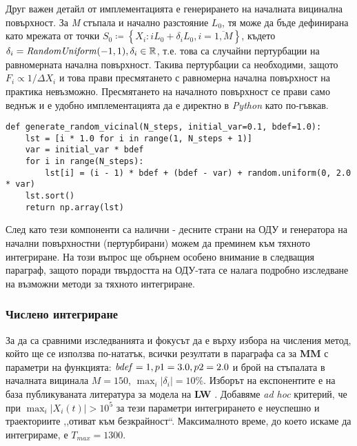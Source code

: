 Друг важен детайл от имплементацията е генерирането на началната вицинална повърхност. За \textit{M} стъпала и начално разстояние $L_0$, тя може да бъде дефинирана като мрежата от точки $S_0 \coloneqq \left\{ X_i: i L_0 + \delta_{i} L_0, i = \overline{1, M} \right\}$, където $\delta_i = \text{\textit{RandomUniform}}(-1,1), \delta_{i} \in \mathbb{R}$, т.е. това са случайни пертурбации на равномерната начална повърхност. Такива пертурбации са необходими, защото $F_i \propto 1/\Delta X_i$ и това прави пресмятането с равномерна начална повърхност на практика невъзможно. Пресмятането на началното повърхност се прави само веднъж и е удобно имплементацията да е директно в \textit{Python} като по-гъвкав.
\begin{verbatim}
def generate_random_vicinal(N_steps, initial_var=0.1, bdef=1.0):
    lst = [i * 1.0 for i in range(1, N_steps + 1)]
    var = initial_var * bdef
    for i in range(N_steps):
        lst[i] = (i - 1) * bdef + (bdef - var) + random.uniform(0, 2.0 * var)
    lst.sort()
    return np.array(lst)
\end{verbatim}

След като тези компоненти са налични - десните страни на ОДУ и генератора на начални повърхностни (пертурбирани) можем да преминем към тяхното интегриране. На този въпрос ще обърнем особено внимание в следващия параграф, защото поради твърдостта на ОДУ-тата се налага подробно изследване на възможни методи за тяхното интегриране.

\subsubsection{Числено интегриране}
За да са сравними изследванията и фокусът да е върху избора на числения метод, който ще се използва по-нататък, всички резултати в параграфа са за \textbf{MM} с параметри на функцията: $\text{\textit{bdef}} = 1, p1 = 3.0, p2 = 2.0$ и брой на стъпалата в началната вицинала $M = 150$, $\max_i |\delta_i| = 10\%$. Изборът на експонентите е на база публикуваната литература за модела на \textbf{LW} \cite{Liu1998}. Добавяме \textit{ad hoc} критерий, че при $\max_{i} |X_i(t)| > 10^{5}$ за тези параметри интегрирането е неуспешно и траекториите ,,отиват към безкрайност``. Максималното време, до което искаме да интегрираме, е $T_{max} = 1300$.

